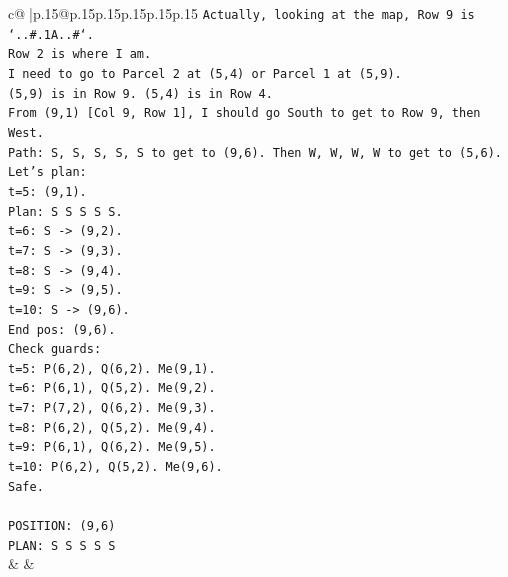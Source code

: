 \documentclass{article}
\begin{document}
{\begin{supertabular}{c@{$\;$}|p{.15\linewidth}@{}p{.15\linewidth}p{.15\linewidth}p{.15\linewidth}p{.15\linewidth}p{.15\linewidth}}
{{{\texttt{Actually, looking at the map, Row 9 is `..\#.1A..\#`.} \\
\texttt{Row 2 is where I am.} \\
\texttt{I need to go to Parcel 2 at (5,4) or Parcel 1 at (5,9).} \\
\texttt{(5,9) is in Row 9. (5,4) is in Row 4.} \\
\texttt{From (9,1) {[}Col 9, Row 1{]}, I should go South to get to Row 9, then West.} \\
\texttt{Path: S, S, S, S, S to get to (9,6). Then W, W, W, W to get to (5,6).} \\
\texttt{Let's plan:} \\
\texttt{t=5: (9,1).} \\
\texttt{Plan: S S S S S.} \\
\texttt{t=6: S {-}> (9,2).} \\
\texttt{t=7: S {-}> (9,3).} \\
\texttt{t=8: S {-}> (9,4).} \\
\texttt{t=9: S {-}> (9,5).} \\
\texttt{t=10: S {-}> (9,6).} \\
\texttt{End pos: (9,6).} \\
\texttt{Check guards:} \\
\texttt{t=5: P(6,2), Q(6,2). Me(9,1).} \\
\texttt{t=6: P(6,1), Q(5,2). Me(9,2).} \\
\texttt{t=7: P(7,2), Q(6,2). Me(9,3).} \\
\texttt{t=8: P(6,2), Q(5,2). Me(9,4).} \\
\texttt{t=9: P(6,1), Q(6,2). Me(9,5).} \\
\texttt{t=10: P(6,2), Q(5,2). Me(9,6).} \\
\texttt{Safe.} \\
\\ 
\texttt{POSITION: (9,6)} \\
\texttt{PLAN: S S S S S} \\
            }
        }
    }
    & & \\ \\


\end{supertabular}}
\end{document}

